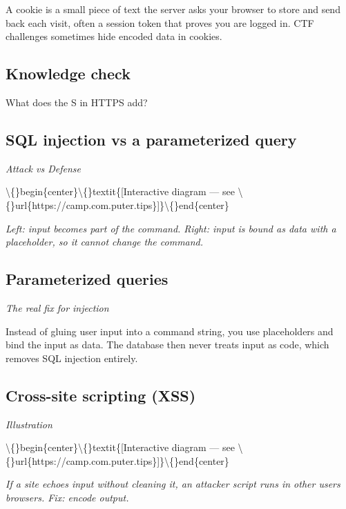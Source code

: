 \documentclass[12pt,openany]{book}
\begin{document}
A cookie is a small piece of text the server asks your browser to store and send back each visit, often a session token that proves you are logged in. CTF challenges sometimes hide encoded data in cookies.

\medskip

\subsection*{Knowledge check}

What does the S in HTTPS add?

\medskip

\subsection*{SQL injection vs a parameterized query}
{\small\itshape\color{gray}Attack vs Defense}

\textbackslash\{\}begin\{center\}\textbackslash\{\}textit\{[Interactive diagram --- see \textbackslash\{\}url\{https://camp.com.puter.tips\}]\}\textbackslash\{\}end\{center\}

{\small\itshape\color{gray}Left: input becomes part of the command. Right: input is bound as data with a placeholder, so it cannot change the command.}

\medskip

\subsection*{Parameterized queries}
{\small\itshape\color{gray}The real fix for injection}


Instead of gluing user input into a command string, you use placeholders and bind the input as data. The database then never treats input as code, which removes SQL injection entirely.

\medskip

\subsection*{Cross-site scripting (XSS)}
{\small\itshape\color{gray}Illustration}

\textbackslash\{\}begin\{center\}\textbackslash\{\}textit\{[Interactive diagram --- see \textbackslash\{\}url\{https://camp.com.puter.tips\}]\}\textbackslash\{\}end\{center\}

{\small\itshape\color{gray}If a site echoes input without cleaning it, an attacker script runs in other users browsers. Fix: encode output.}
\end{document}
